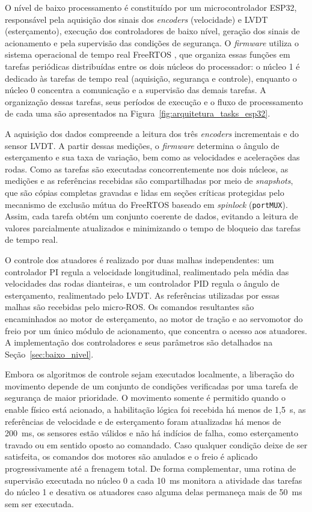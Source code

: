 O nível de baixo processamento é constituído por um microcontrolador ESP32, responsável pela aquisição dos sinais dos \textit{encoders} (velocidade) e LVDT (esterçamento), execução dos controladores de baixo nível, geração dos sinais de acionamento e pela supervisão das condições de segurança. O \textit{firmware} utiliza o sistema operacional de tempo real FreeRTOS \citep{Barry2024FreeRTOS}, que organiza essas funções em tarefas periódicas distribuídas entre os dois núcleos do processador: o núcleo 1 é dedicado às tarefas de tempo real (aquisição, segurança e controle), enquanto o núcleo 0 concentra a comunicação e a supervisão das demais tarefas. A organização dessas tarefas, seus períodos de execução e o fluxo de processamento de cada uma são apresentados na Figura~\ref{fig:arquitetura_tasks_esp32}.

A aquisição dos dados compreende a leitura dos três \textit{encoders} incrementais e do sensor LVDT. A partir dessas medições, o \textit{firmware} determina o ângulo de esterçamento e sua taxa de variação, bem como as velocidades e acelerações das rodas. Como as tarefas são executadas concorrentemente nos dois núcleos, as medições e as referências recebidas são compartilhadas por meio de \textit{snapshots}, que são cópias completas gravadas e lidas em seções críticas protegidas pelo mecanismo de exclusão mútua do FreeRTOS baseado em \textit{spinlock} (\texttt{portMUX}). Assim, cada tarefa obtém um conjunto coerente de dados, evitando a leitura de valores parcialmente atualizados e minimizando o tempo de bloqueio das tarefas de tempo real.

O controle dos atuadores é realizado por duas malhas independentes: um controlador PI regula a velocidade longitudinal, realimentado pela média das velocidades das rodas dianteiras, e um controlador PID regula o ângulo de esterçamento, realimentado pelo LVDT. As referências utilizadas por essas malhas são recebidas pelo micro-ROS. Os comandos resultantes são encaminhados ao motor de esterçamento, ao motor de tração e ao servomotor do freio por um único módulo de acionamento, que concentra o acesso aos atuadores. A implementação dos controladores e seus parâmetros são detalhados na Seção~\ref{sec:baixo_nivel}.

Embora os algoritmos de controle sejam executados localmente, a liberação do movimento depende de um conjunto de condições verificadas por uma tarefa de segurança de maior prioridade. O movimento somente é permitido quando o enable físico está acionado, a habilitação lógica foi recebida há menos de 1,5~s, as referências de velocidade e de esterçamento foram atualizadas há menos de 200~ms, os sensores estão válidos e não há indícios de falha, como esterçamento travado ou em sentido oposto ao comandado. Caso qualquer condição deixe de ser satisfeita, os comandos dos motores são anulados e o freio é aplicado progressivamente até a frenagem total. De forma complementar, uma rotina de supervisão executada no núcleo 0 a cada 10~ms monitora a atividade das tarefas do núcleo 1 e desativa os atuadores caso alguma delas permaneça mais de 50~ms sem ser executada.

